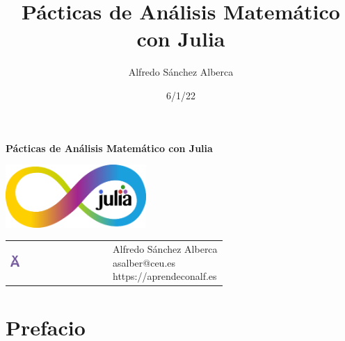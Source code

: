 \documentclass[
  a4paper,
]{scrreport}
\title{Pácticas de Análisis Matemático con Julia}
\author{Alfredo Sánchez Alberca}
\date{6/1/22}
\renewcommand*\contentsname{Tabla de contenidos}
\newcommand\contentsname{Tabla de contenidos}
\theoremstyle{definition}
\theoremstyle{remark}
\begin{document}
\begin{titlepage}

\begin{center}
\vspace*{5cm}

\Huge
{\textbf{\textsf{Pácticas de Análisis Matemático con Julia}}}

\vspace{0.5cm}
\LARGE
{\textbf{\textsf{}}}

\vspace{1.5cm}

\includegraphics[width=0.4\textwidth]{img/logos/infinito-julia.png}
\end{center}

\vfill

\begin{flushleft}
\begin{tabular}{ll}
\includegraphics[width=0.1\textwidth]{img/logos/aprendeconalf.png} & \parbox[b]{5cm}{\Large\textsf{Alfredo
Sánchez
Alberca}\\ \textsf{asalber@ceu.es} \\ \textsf{https://aprendeconalf.es}}
\end{tabular}
\end{flushleft}
\end{titlepage}\ifdefined\Shaded\renewenvironment{Shaded}{\begin{tcolorbox}[boxrule=0pt, frame hidden, sharp corners, borderline west={3pt}{0pt}{shadecolor}, breakable, enhanced, interior hidden]}{\end{tcolorbox}}\fi

\renewcommand*\contentsname{Tabla de contenidos}
{
\hypersetup{linkcolor=}
\setcounter{tocdepth}{2}
\tableofcontents
}

\hypertarget{prefacio}{%
\chapter*{Prefacio}\label{prefacio}}
\end{document}

